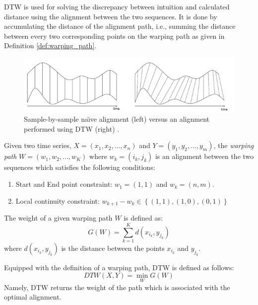 DTW is used for solving the discrepancy between intuition and calculated distance using the alignment between the two sequences. 
It is done by accumulating the distance of the alignment path, i.e., summing the distance between every two corresponding points on the warping path as given in Definition \ref{def:warping_path}. 

\begin{figure}
\centering
\includegraphics[width=1\textwidth]{./figures/dtw_dequence_demo}      
\caption{Sample-by-sample na\"{\i}ve alignment (left) versus an alignment performed using DTW (right) \cite{rath2003word}.}
\label{fig:dtw_dequence_demo}
\end{figure}

\iftoggle{edit-mode}{\hspace{0pt}\marginpar{Warping path Definition}}{}
\begin{definition}
Given two time series, $X = (x_1,x_2,...,x_n)$ and $Y = (y_1,y_2,...,y_m)$, the \emph{warping path} $W=(w_1,w_2,...,w_K)$ where ${w_k} = (i_k,j_k)$ is an alignment between the two sequences which satisfies the following conditions: 
\begin{enumerate}
\item Start and End point constraint: $w_1 = (1,1)$ and $w_k = (n,m)$. 
\item Local continuity constraint: ${w_{k + 1}} - {w_k} \in \left\{ {\left( {1,1} \right),\left( {1,0} \right),\left( {0,1} \right)} \right\}$
\end{enumerate}	 
The weight of a given warping path $W$ is defined as:
\begin{equation}
G(W) = \sum\limits_{k = 1}^{K} d(x_{i_k},y_{j_k} )
\end{equation}
where $d(x_{i_k},y_{j_k})$ is the distance between the points $x_{i_k}$ and $y_{j_k}$.
\label{def:warping_path}
\end{definition}

\iftoggle{edit-mode}{\hspace{0pt}\marginpar{DTW Definition}}{}
Equipped with the definition of a warping path, DTW is defined as follows:
\begin{equation}
DTW(X,Y)=\min\limits_{W} {G(W)}
\end{equation}
Namely, DTW returns the weight of the path which is associated with the optimal alignment.

